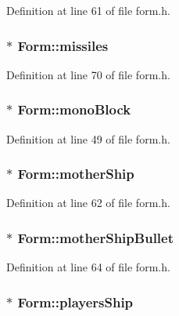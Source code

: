 Definition at line 61 of file form.h.\hypertarget{class_form_ad2c32c2f532f56f4e3cb5945b8083cf0}{
\subsubsection[{missiles}]{$\ast$ {\bf Form::missiles}}}
\label{class_form_ad2c32c2f532f56f4e3cb5945b8083cf0}


Definition at line 70 of file form.h.\hypertarget{class_form_a2eaddff9897b282b0f693d62fa5fb353}{
\subsubsection[{monoBlock}]{$\ast$ {\bf Form::monoBlock}}}
\label{class_form_a2eaddff9897b282b0f693d62fa5fb353}


Definition at line 49 of file form.h.\hypertarget{class_form_a39ad83a17a081174bca47eba9b38f0b9}{
\subsubsection[{motherShip}]{$\ast$ {\bf Form::motherShip}}}
\label{class_form_a39ad83a17a081174bca47eba9b38f0b9}


Definition at line 62 of file form.h.\hypertarget{class_form_ad6ddaf1cdc66b62a9f1b59a32ca818f6}{
\subsubsection[{motherShipBullet}]{$\ast$ {\bf Form::motherShipBullet}}}
\label{class_form_ad6ddaf1cdc66b62a9f1b59a32ca818f6}


Definition at line 64 of file form.h.\hypertarget{class_form_ad209e021a3dbed6ae132c32a642aaf2f}{
\subsubsection[{playersShip}]{$\ast$ {\bf Form::playersShip}}}
\label{class_form_ad209e021a3dbed6ae132c32a642aaf2f}


